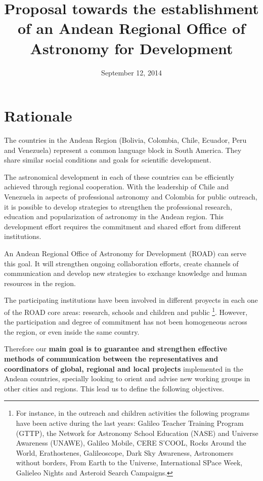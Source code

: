 \documentclass[12pt]{article}
\title{Proposal towards the establishment of an Andean Regional Office of
  Astronomy for Development}
\date{September 12, 2014}
\begin{document}
\maketitle
\tableofcontents
\newpage

\section{Rationale}

The countries in the Andean Region (Bolivia, Colombia, Chile, Ecuador,
Peru and Venezuela) represent a common language block in South
America. They share similar social conditions and goals for scientific
development.  

The astronomical development in each of these countries can be
efficiently achieved through regional cooperation. With the leadership
of Chile and Venezuela in aspects of professional astronomy and
Colombia for public outreach, it is possible to develop strategies to
strengthen the professional research, education and popularization of
astronomy in the Andean region. This development effort requires the
commitment and shared effort from different institutions. 

An Andean Regional Office of Astronomy for Development (ROAD) can
serve this goal.  It will strengthen ongoing collaboration efforts,
create channels of communication and develop new strategies to
exchange knowledge and human resources in the region.  


The participating institutions have been involved in different
proyects in each one of the ROAD core areas: research, schools and
children and public \footnote{For instance, in the outreach and children activities
  the following programs have been active during the last years: Galileo Teacher Training
  Program (GTTP), the Network for Astronomy School Education (NASE)
  and Universe Awareness (UNAWE), Galileo Mobile, CERE S'COOL, Rocks
  Around the World, Erathostenes, Galileoscope, Dark Sky Awareness,
  Astronomers without borders, From Earth to the Universe,
  International SPace Week, Galieleo Nights and Asteroid Search
  Campaigns.}. However, the participation and degree of commitment
has not been homogeneous across the region, or even inside the same
country. 

Therefore our {\bf main goal is to guarantee and strengthen effective
  methods of communication between the representatives and
  coordinators of global, regional and local projects} implemented  in
the Andean countries, specially looking to orient and advise new
working groups in  other cities and regions. This lead us to define
the following objectives.
\end{document}
